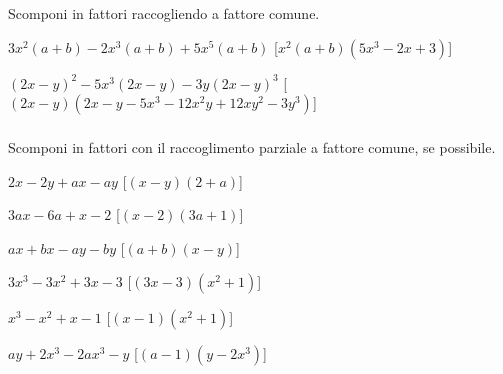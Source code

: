 \begin{esercizio}[\Ast]
Scomponi in fattori raccogliendo a fattore comune.
\label{ese:div.012}
 \begin{enumeratea}
 \item \(3x^{2}(a+b)-2x^{3}(a+b)+5x^{5}(a+b)\)
   \hfill [\(x^{2}(a+b)(5x^{3}-2x+3)\)]
 \item \((2x-y)^{2}-5x^{3}(2x-y)-3y(2x-y)^{3}\)
   \hfill [\((2x-y)\left(2x-y-5x^3-12x^2y+12xy^2-3y^3\right)\)]
\end{enumeratea}
\end{esercizio}

\subsubsection*{}

\begin{esercizio}[\Ast]
\label{ese:div.013}
Scomponi in fattori con il raccoglimento parziale a fattore comune, se possibile.
\begin{multicols}{2}
 \begin{enumeratea}
 \item \(2x-2y+ax-ay\) \hfill [\((x-y)(2+a)\)]
 \item \(3ax-6a+x-2\) \hfill [\((x-2)(3a+1)\)]
 \item \(ax+bx-ay-by\) \hfill [\((a+b)(x-y)\)]
 \item \(3x^{3}-3x^{2}+3x-3\) \hfill [\((3x-3)\left(x^2+1\right)\)]
 \item \(x^{3}-x^{2}+x-1\) \hfill [\((x-1)\left(x^{2}+1\right)\)]
 \item \(ay+2x^{3}-2ax^{3}-y\) \hfill [\((a-1)\left(y-2x^{3}\right)\)]
\end{enumeratea}
\end{multicols}
\end{esercizio}

